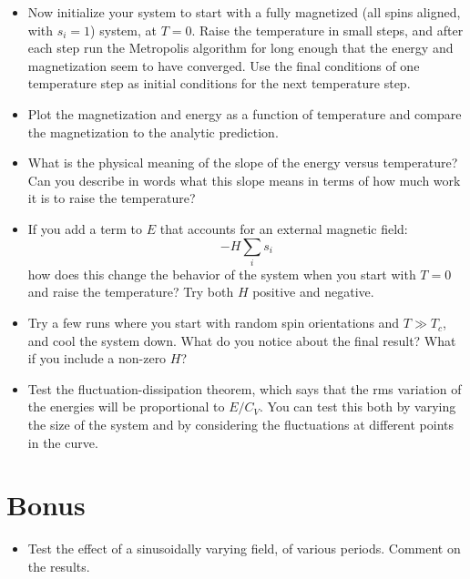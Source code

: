 \documentclass[11pt, preprint]{aastex}
\begin{document}
\begin{itemize}
\item Now initialize your system to start with a fully magnetized (all
  spins aligned, with $s_i = 1$) system, at $T=0$. Raise the
  temperature in small steps, and after each step run the Metropolis
  algorithm for long enough that the energy and magnetization seem to
  have converged. Use the final conditions of one temperature step as
  initial conditions for the next temperature step.
\item Plot the magnetization and energy as a function of temperature
  and compare the magnetization to the analytic prediction.
\item What is the physical meaning of the slope of the energy versus
  temperature?  Can you describe in words what this slope means in
  terms of how much work it is to raise the temperature?
\item If you add a term to $E$ that accounts for an external magnetic
  field:
  \begin{equation}
    -H \sum_i s_i
  \end{equation}
  how does this change the behavior of the system when you start with
  $T=0$ and raise the temperature?  Try both $H$ positive and
  negative.
\item Try a few runs where you start with random spin orientations and
  $T\gg T_c$, and cool the system down. What do you notice about the
  final result? What if you include a non-zero $H$?
\item Test the fluctuation-dissipation theorem, which says that the
  rms variation of the energies will be proportional to $E/C_V$. You
  can test this both by varying the size of the system and by
  considering the fluctuations at different points in the curve.
\end{itemize}

\section{Bonus}

\begin{itemize}
\item Test the effect of a sinusoidally varying field, of various
  periods. Comment on the results.
\end{itemize}
\end{document}
